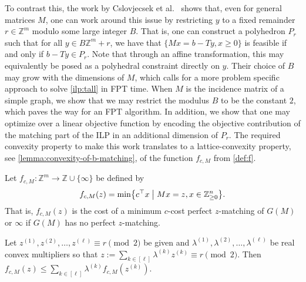 \documentclass[a4paper,UKenglish,cleveref,thm-restate]{lipics-v2021}
\newcommand{\Z}{\mathbb Z}
\begin{document}
To contrast this, the work by Cslovjecsek et al.~\cite{DBLP:conf/soda/CslovjecsekKLPP24} shows that, even for general matrices $M$, one can work around this issue by restricting $y$ to a fixed remainder $r\in\Z^m$ modulo some large integer $B$. That is, one can construct a polyhedron $P_r$ such that for all $y\in B\Z^m+r$, we have that $\{Mx=b-Ty,x\ge0\}$ is feasible if and only if $b-Ty\in P_r$. Note that through an affine transformation, this may equivalently be posed as a polyhedral constraint directly on $y$. Their choice of $B$ may grow with the dimensions of $M$, which calls for a more problem specific approach to solve \cref{ilp:tall} in FPT time. When $M$ is the incidence matrix of a simple graph, we show that we may restrict the modulus $B$ to be the constant $2$, which paves the way for an FPT algorithm. In addition, we show that one may optimize over a linear objective function by encoding the objective contribution of the matching part of the ILP in an additional dimension of $P_r$. The required convexity property to make this work translates to a lattice-convexity property, see \cref{lemma:convexity-of-b-matching}, of the function $f_{c,M}$ from \cref{def:f}.

\begin{definition}
    Let $f_{c,M}:\Z^m\to\Z\cup\{\infty\}$ be defined by
    \[
        f_{c,M}(z)=\min\bigl\{c^\top x\bigm\vert Mx=z,x\in\Z_{\ge0}^n\bigr\}.
    \]
    That is, $f_{c,M}(z)$ is the cost of a minimum $c$-cost perfect $z$-matching of $G(M)$ or $\infty$ if $G(M)$ has no perfect $z$-matching.
    \label{def:f}
\end{definition}

\begin{lemma}
    Let $z^{(1)},z^{(2)},\dots,z^{(\ell)}\equiv r\pmod2$ be given and $\lambda^{(1)},\lambda^{(2)},\dots,\lambda^{(\ell)}$ be real convex multipliers so that $z:=\sum_{k\in[\ell]}\lambda^{(k)}z^{(k)}\equiv r\pmod2$. Then $f_{c,M}(z)\le\sum_{k\in[\ell]}\lambda^{(k)}f_{c,M}(z^{(k)})$.
    \label{lemma:convexity-of-b-matching}
\end{lemma}
\end{document}
